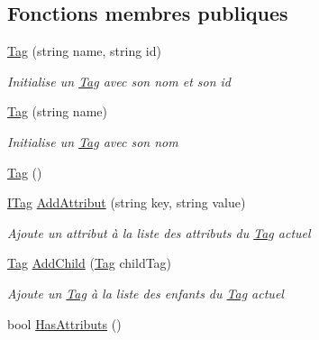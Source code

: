 \subsection*{Fonctions membres publiques}
\begin{DoxyCompactItemize}
\item 
\mbox{\hyperlink{class_m_t_connect_agent_1_1_model_1_1_tag_a7a97e2920ac3143e7e54ff26e5e43d0a}{Tag}} (string name, string id)
\begin{DoxyCompactList}\small\item\em Initialise un \mbox{\hyperlink{class_m_t_connect_agent_1_1_model_1_1_tag}{Tag}} avec son nom et son id \end{DoxyCompactList}\item 
\mbox{\hyperlink{class_m_t_connect_agent_1_1_model_1_1_tag_a52a0e7d9a403166030deed02bd876697}{Tag}} (string name)
\begin{DoxyCompactList}\small\item\em Initialise un \mbox{\hyperlink{class_m_t_connect_agent_1_1_model_1_1_tag}{Tag}} avec son nom \end{DoxyCompactList}\item 
\mbox{\hyperlink{class_m_t_connect_agent_1_1_model_1_1_tag_afd32a03ff27dadb13432b288e3cee54f}{Tag}} ()
\item 
\mbox{\hyperlink{interface_m_t_connect_agent_1_1_model_1_1_i_tag}{I\+Tag}} \mbox{\hyperlink{class_m_t_connect_agent_1_1_model_1_1_tag_ad39fa56fac8573b45c5d987288928e31}{Add\+Attribut}} (string key, string value)
\begin{DoxyCompactList}\small\item\em Ajoute un attribut à la liste des attributs du \mbox{\hyperlink{class_m_t_connect_agent_1_1_model_1_1_tag}{Tag}} actuel \end{DoxyCompactList}\item 
\mbox{\hyperlink{class_m_t_connect_agent_1_1_model_1_1_tag}{Tag}} \mbox{\hyperlink{class_m_t_connect_agent_1_1_model_1_1_tag_a74c01a8e302f87b611980b583e58b8c3}{Add\+Child}} (\mbox{\hyperlink{class_m_t_connect_agent_1_1_model_1_1_tag}{Tag}} child\+Tag)
\begin{DoxyCompactList}\small\item\em Ajoute un \mbox{\hyperlink{class_m_t_connect_agent_1_1_model_1_1_tag}{Tag}} à la liste des enfants du \mbox{\hyperlink{class_m_t_connect_agent_1_1_model_1_1_tag}{Tag}} actuel \end{DoxyCompactList}\item 
bool \mbox{\hyperlink{class_m_t_connect_agent_1_1_model_1_1_tag_a46dc1cce56e5d17f1826fdc53045f6ff}{Has\+Attributs}} ()

\end{DoxyCompactItemize}
